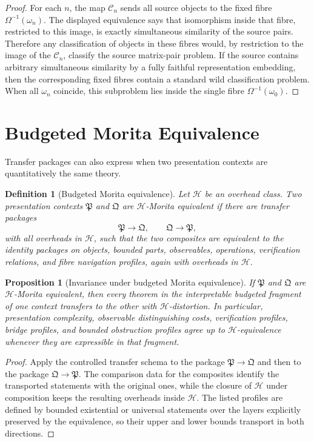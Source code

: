 \documentclass[11pt]{article}
\newtheorem{proposition}[theorem]{Proposition}
\newtheorem{definition}[theorem]{Definition}
\begin{document}
\begin{proof}
For each \(n\), the map \(\mathcal C_n\) sends all source objects to the fixed fibre \(\Omega^{-1}(\omega_n)\). The displayed equivalence says that isomorphism inside that fibre, restricted to this image, is exactly simultaneous similarity of the source pairs. Therefore any classification of objects in these fibres would, by restriction to the image of the \(\mathcal C_n\), classify the source matrix-pair problem. If the source contains arbitrary simultaneous similarity by a fully faithful representation embedding, then the corresponding fixed fibres contain a standard wild classification problem. When all \(\omega_n\) coincide, this subproblem lies inside the single fibre \(\Omega^{-1}(\omega_0)\).
\end{proof}

\section{Budgeted Morita Equivalence}

Transfer packages can also express when two presentation contexts are quantitatively the same theory.

\begin{definition}[Budgeted Morita equivalence]
Let \(\mathcal H\) be an overhead class. Two presentation contexts \(\mathfrak P\) and \(\mathfrak Q\) are \(\mathcal H\)-Morita equivalent if there are transfer packages
\[
\mathfrak P\longrightarrow\mathfrak Q,
\qquad
\mathfrak Q\longrightarrow\mathfrak P,
\]
with all overheads in \(\mathcal H\), such that the two composites are equivalent to the identity packages on objects, bounded parts, observables, operations, verification relations, and fibre navigation profiles, again with overheads in \(\mathcal H\).
\end{definition}

\begin{proposition}[Invariance under budgeted Morita equivalence]
If \(\mathfrak P\) and \(\mathfrak Q\) are \(\mathcal H\)-Morita equivalent, then every theorem in the interpretable budgeted fragment of one context transfers to the other with \(\mathcal H\)-distortion. In particular, presentation complexity, observable distinguishing costs, verification profiles, bridge profiles, and bounded obstruction profiles agree up to \(\mathcal H\)-equivalence whenever they are expressible in that fragment.
\end{proposition}

\begin{proof}
Apply the controlled transfer schema to the package \(\mathfrak P\to\mathfrak Q\) and then to the package \(\mathfrak Q\to\mathfrak P\). The comparison data for the composites identify the transported statements with the original ones, while the closure of \(\mathcal H\) under composition keeps the resulting overheads inside \(\mathcal H\). The listed profiles are defined by bounded existential or universal statements over the layers explicitly preserved by the equivalence, so their upper and lower bounds transport in both directions.
\end{proof}
\end{document}
